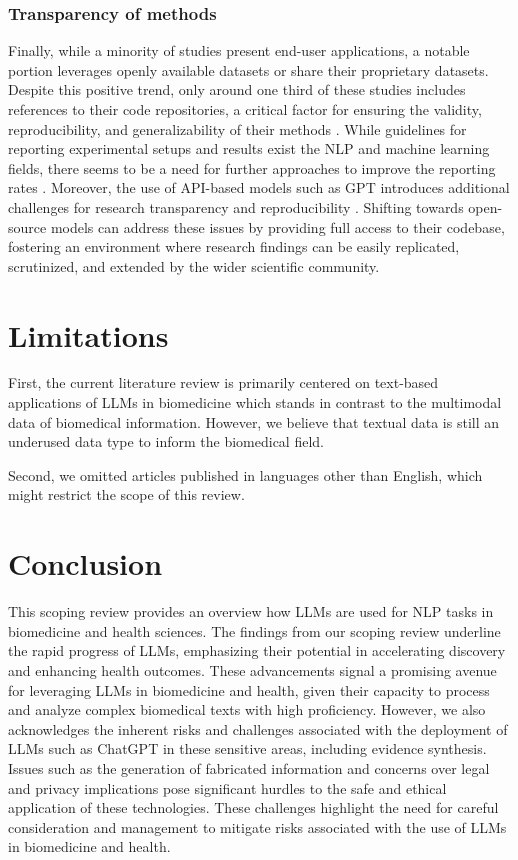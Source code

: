\documentclass[fleqn,10pt]{olplainarticle}
\begin{document}
\subsubsection*{Transparency of methods}
Finally, while a minority of studies present end-user applications, a notable portion leverages openly available datasets or share their proprietary datasets. Despite this positive trend, only around one third of these studies includes references to their code repositories, a critical factor for ensuring the validity, reproducibility, and generalizability of their methods \citep{goldacre2019researchers, kim2020data}. While guidelines for reporting experimental setups and results exist the NLP and machine learning fields, there seems to be a need for further approaches to improve the reporting rates \citep{dodge2019show, kapoor2023reforms,magnusson2023reproducibility}. Moreover, the use of API-based models such as GPT introduces additional challenges for research transparency and reproducibility \citep{liesenfeld2023opening}. Shifting towards open-source models can address these issues by providing full access to their codebase, fostering an environment where research findings can be easily replicated, scrutinized, and extended by the wider scientific community. %

\section*{Limitations}
\label{sec:limitations}
First, the current literature review is primarily centered on text-based applications of LLMs in biomedicine which stands in contrast to the multimodal data of biomedical information. However, we believe that textual data is still an underused data type to inform the biomedical field.

Second, we omitted articles published in languages other than English, which might restrict the scope of this review.



\section*{Conclusion}
\label{sec:conclusion}
This scoping review provides an overview how LLMs are used for NLP tasks in biomedicine and health sciences. The findings from our scoping review underline the rapid progress of LLMs, emphasizing their potential in accelerating discovery and enhancing health outcomes. These advancements signal a promising avenue for leveraging LLMs in biomedicine and health, given their capacity to process and analyze complex biomedical texts with high proficiency.
However, we also acknowledges the inherent risks and challenges associated with the deployment of LLMs such as ChatGPT in these sensitive areas, including evidence synthesis. Issues such as the generation of fabricated information and concerns over legal and privacy implications pose significant hurdles to the safe and ethical application of these technologies. These challenges highlight the need for careful consideration and management to mitigate risks associated with the use of LLMs in biomedicine and health.
\end{document}
